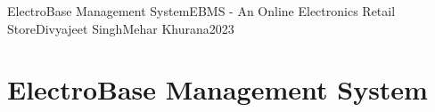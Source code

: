 \documentclass{solutionclass}
\begin{document}
\pretitle
{ElectroBase Management System}{EBMS - An Online Electronics Retail Store}{Divyajeet Singh}{Mehar Khurana}{2023}

\def\homeworkNumber{1}

\makeatletter
    \startcontents[sections]

    \chapter{\huge{ElectroBase Management System}}

    
    
    
    
    
    
    
    
\end{document}
